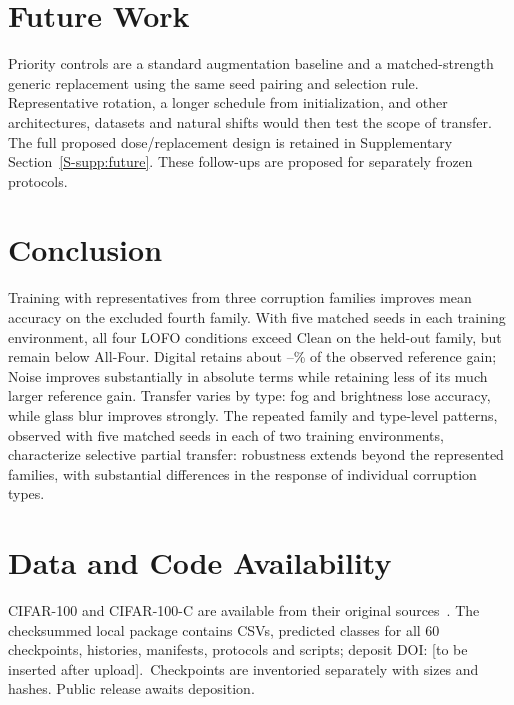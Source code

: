 \documentclass[twoside,a4paper,11pt]{article}
\newif\ifblindreview
\begin{document}
\section{Future Work}
\label{sec:future}
Priority controls are a standard augmentation baseline and a matched-strength generic replacement using the same seed pairing and selection rule. Representative rotation, a longer schedule from initialization, and other architectures, datasets and natural shifts would then test the scope of transfer. The full proposed dose/replacement design is retained in Supplementary Section~\ref{S-supp:future}. These follow-ups are proposed for separately frozen protocols.

\section{Conclusion}
\label{sec:conclusion}
Training with representatives from three corruption families improves mean accuracy on the excluded fourth family. With five matched seeds in each training environment, all four LOFO conditions exceed Clean on the held-out family, but remain below All-Four. Digital retains about \RatioPctDigitalWin{}--\RatioPctDigitalMac{}\% of the observed reference gain; Noise improves substantially in absolute terms while retaining less of its much larger reference gain. Transfer varies by type: fog and brightness lose accuracy, while glass blur improves strongly. The repeated family and type-level patterns, observed with five matched seeds in each of two training environments, characterize selective partial transfer: robustness extends beyond the represented families, with substantial differences in the response of individual corruption types.

\section*{Data and Code Availability}
CIFAR-100 and CIFAR-100-C are available from their original sources~\cite{krizhevsky2009tiny,hendrycks2019cifar100c}. \ifblindreview Materials will be released upon acceptance.\else The checksummed local package contains CSVs, predicted classes for all 60 checkpoints, histories, manifests, protocols and scripts; deposit DOI: [to be inserted after upload].\fi\ Checkpoints are inventoried separately with sizes and hashes. Public release awaits deposition.
\end{document}
